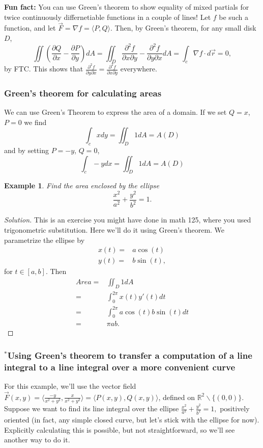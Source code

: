 \documentclass[12pt]{article}
\newcommand{\p}{\partial}
\newcommand{\R}{ \mathbb{R}}
\newcommand{\vr}{\vec{r}{}}
\newcommand{\vF}{\vec{F}}
\renewcommand{\lg}{\langle}
\newcommand{\rg}{\rangle}
\newcommand{\Q}{\frac{\p Q}{\p x}}
\renewcommand{\P}{\frac{\p P}{\p y}}
\newenvironment{solution}
  {\begin{proof}[Solution]}
  {\end{proof}
  
  }
\newtheorem{example}{Example}
\begin{document}
\textbf{Fun fact:} You can use Green's theorem to show equality of mixed partials for twice continuously differnetiable functions in a couple of lines! Let $f$ be such a function, and let $\vF=\nabla f=\lg P,Q\rg$. Then, by Green's theorem, for any small disk $D$, $$\iint \left( \Q-\P\right )dA=\iint_D \frac{\p^2 f}{\p x\p y}-\frac{\p^2 f}{\p y\p x}dA=\int_c\nabla f \cdot d\vr=0,$$ by FTC. This shows that $\frac{\p^2 f}{\p y\p x}=\frac{\p^2f}{\p x\p y}$ everywhere.

\subsubsection*{Green's theorem for calculating areas}
We can use Green's Theorem to express the area of a domain. If we set $Q=x$, $P=0$ we find \begin{equation}
\int_c x dy=\iint_D 1 dA =A(D)
\end{equation}
and by setting $P=-y$, $Q=0$, \begin{equation}
\int_c -y dx=\iint_D 1 dA =A(D)
\end{equation}
\begin{example}
Find the area enclosed by the ellipse $$\frac{x^2}{a^2}+\frac{y^2}{b^2}=1.$$ 
\end{example}
\begin{solution}
This is an exercise you might have done in math 125, where you used trigonometric substitution. Here we'll do it using Green's theorem. We parametrize the ellipse by \begin{align}
x(t)=&a\cos(t)\\
y(t)=&b\sin(t),
\end{align}
for $t\in[a,b]$. Then \begin{align*}
Area=&\iint_D 1 dA\\
=&\int_0^{2\pi}x(t)y'(t) dt\\
=&\int_0^{2\pi}a\cos(t)b\sin(t)dt\\
=&\pi a b.
\end{align*}
\end{solution}


\subsubsection*{${}^*$Using Green's theorem to transfer a computation of a line integral to a line integral over a more convenient curve}
For this example, we'll use the vector field $\vF(x,y)=\lg \frac{-y}{x^2+y^2},\frac{x}{x^2+y^2}\rg=\lg P(x,y),Q(x,y)\rg$, defined on $\R^2\backslash \{(0,0)\}$. Suppose we want to find its line integral over the ellipse $\frac{x^2}{a^2}+\frac{y^2}{b^2}=1,$ positively oriented (in fact, any simple closed curve, but let's stick with the ellipse for now). Explicitly calculating this is possible, but not straightforward, so we'll see another way to do it.
\end{document}
